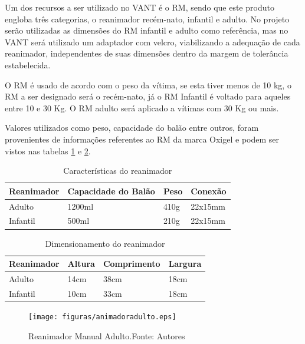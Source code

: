 Um dos recursos a ser utilizado no VANT é o RM, sendo que este produto engloba três categorias, o reanimador recém-nato, infantil e adulto. No projeto serão utilizadas as dimensões do RM infantil e adulto como referência, mas no VANT será utilizado um adaptador com velcro, viabilizando a adequação de cada reanimador, independentes de suas dimensões dentro da margem de tolerância estabelecida.

O RM é usado de acordo com o peso da vítima, se esta tiver menos de 10 kg, o RM a ser designado será o recém-nato, já o RM Infantil é voltado para aqueles entre 10 e 30 Kg. O RM adulto será aplicado a vítimas com 30 Kg ou mais.

Valores utilizados como peso, capacidade do balão entre outros, foram provenientes de informações referentes ao RM da marca Oxigel e podem
ser vistos nas tabelas \ref{tab:caracteristicas} e \ref{tab:dimensionamento}.

\begin{table}[H]
\centering
	\caption{Características do reanimador}
\label{tab:caracteristicas}
\begin{tabular}{|l|l|l|l|}
\hline
\multicolumn{1}{|c|}{Reanimador} & Capacidade do Balão & Peso & Conexão \\ \hline
Adulto                           & 1200ml              & 410g & 22x15mm \\ \hline
Infantil                         & 500ml               & 210g & 22x15mm \\ \hline

\end{tabular}
\end{table}

\begin{table}[H]
\centering
	\caption{Dimensionamento do reanimador}
\label{tab:dimensionamento}
\begin{tabular}{|l|l|l|l|}
\hline
\multicolumn{1}{|c|}{Reanimador} & Altura & Comprimento & Largura \\ \hline
Adulto                           & 14cm   & 38cm        & 18cm    \\ \hline
Infantil                         & 10cm   & 33cm        & 18cm    \\ \hline
\end{tabular}
\end{table}


\vfill
\begin{figure}[H]
	\centering
	  \texttt{[image: figuras/animadoradulto.eps]}
	\caption{Reanimador Manual Adulto.Fonte: Autores}
	\label{fig:animadoradulto}
\end{figure}


